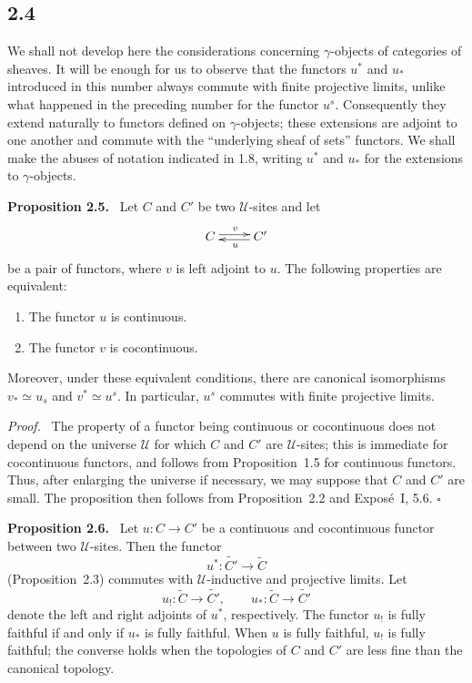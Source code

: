 \documentclass[11pt]{article}
\newcommand{\U}{\mathcal{U}}
\newcommand{\qedtext}{\hfill\(\square\)}
\newenvironment{statement}[1]{\par\medskip\noindent\textbf{#1.}\ }{\par\medskip}
\newenvironment{prooftext}{\par\noindent\emph{Proof.}\ }{\par\medskip}
\begin{document}
\subsection*{2.4}
We shall not develop here the considerations concerning \(\gamma\)-objects of categories of sheaves. It will be enough for us to observe that the functors \(u^{\ast}\) and \(u_{\ast}\) introduced in this number always commute with finite projective limits, unlike what happened in the preceding number for the functor \(u^s\). Consequently they extend naturally to functors defined on \(\gamma\)-objects; these extensions are adjoint to one another and commute with the ``underlying sheaf of sets'' functors. We shall make the abuses of notation indicated in 1.8, writing \(u^{\ast}\) and \(u_{\ast}\) for the extensions to \(\gamma\)-objects.

\begin{statement}{Proposition 2.5}
Let \(C\) and \(C'\) be two \(\U\)-sites and let
\[
\xymatrix{C\ar@<2pt>[r]^{v}&C'\ar@<2pt>[l]^{u}}
\]
be a pair of functors, where \(v\) is left adjoint to \(u\). The following properties are equivalent:
\begin{enumerate}[label=\roman*)]
\item The functor \(u\) is continuous.
\item The functor \(v\) is cocontinuous.
\end{enumerate}
Moreover, under these equivalent conditions, there are canonical isomorphisms \(v_{\ast}\simeq u_s\) and \(v^{\ast}\simeq u^s\). In particular, \(u^s\) commutes with finite projective limits.
\end{statement}

\begin{prooftext}
The property of a functor being continuous or cocontinuous does not depend on the universe \(\U\) for which \(C\) and \(C'\) are \(\U\)-sites; this is immediate for cocontinuous functors, and follows from Proposition~1.5 for continuous functors. Thus, after enlarging the universe if necessary, we may suppose that \(C\) and \(C'\) are small. The proposition then follows from Proposition~2.2 and Expos\'e~I, 5.6. \qedtext
\end{prooftext}

\begin{statement}{Proposition 2.6}
Let \(u:C\to C'\) be a continuous and cocontinuous functor between two \(\U\)-sites. Then the functor
\[
u^{\ast}:\widetilde{C'}\to\widetilde C
\]
(Proposition~2.3) commutes with \(\U\)-inductive and projective limits. Let
\[
u_!:\widetilde C\to\widetilde{C'},\qquad u_{\ast}:\widetilde C\to\widetilde{C'}
\]
denote the left and right adjoints of \(u^{\ast}\), respectively. The functor \(u_!\) is fully faithful if and only if \(u_{\ast}\) is fully faithful. When \(u\) is fully faithful, \(u_!\) is fully faithful; the converse holds when the topologies of \(C\) and \(C'\) are less fine than the canonical topology.
\end{statement}
\end{document}
